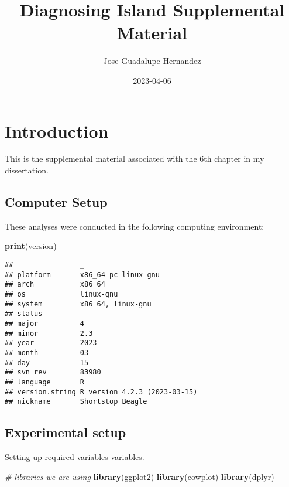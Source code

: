\documentclass[]{book}
\title{Diagnosing Island Supplemental Material}
\author{Jose Guadalupe Hernandez}
\date{2023-04-06}
\newenvironment{Shaded}{\begin{snugshade}}{\end{snugshade}}
\newcommand{\CommentTok}[1]{\textcolor[rgb]{0.56,0.35,0.01}{\textit{#1}}}
\newcommand{\KeywordTok}[1]{\textcolor[rgb]{0.13,0.29,0.53}{\textbf{#1}}}
\newcommand{\NormalTok}[1]{#1}
\begin{document}
\maketitle

{
\setcounter{tocdepth}{1}
\tableofcontents
}
\hypertarget{introduction}{%
\chapter{Introduction}\label{introduction}}

This is the supplemental material associated with the 6th chapter in my dissertation.

\hypertarget{computer-setup}{%
\section{Computer Setup}\label{computer-setup}}

These analyses were conducted in the following computing environment:

\begin{Shaded}
\begin{Highlighting}[]
\KeywordTok{print}\NormalTok{(version)}
\end{Highlighting}
\end{Shaded}

\begin{verbatim}
##                _                           
## platform       x86_64-pc-linux-gnu         
## arch           x86_64                      
## os             linux-gnu                   
## system         x86_64, linux-gnu           
## status                                     
## major          4                           
## minor          2.3                         
## year           2023                        
## month          03                          
## day            15                          
## svn rev        83980                       
## language       R                           
## version.string R version 4.2.3 (2023-03-15)
## nickname       Shortstop Beagle
\end{verbatim}

\hypertarget{experimental-setup}{%
\section{Experimental setup}\label{experimental-setup}}

Setting up required variables variables.

\begin{Shaded}
\begin{Highlighting}[]
\CommentTok{# libraries we are using}
\KeywordTok{library}\NormalTok{(ggplot2)}
\KeywordTok{library}\NormalTok{(cowplot)}
\KeywordTok{library}\NormalTok{(dplyr)}
\end{Highlighting}
\end{Shaded}
\end{document}
